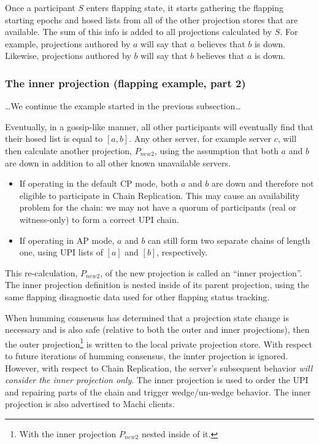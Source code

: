 \documentclass[preprint,10pt]{sigplanconf}
\begin{document}
Once a participant $S$ enters flapping state, it starts gathering the
flapping starting epochs and hosed lists from all of the other
projection stores that are available.  The sum of this info is added
to all projections calculated by $S$.
For example, projections authored by $a$ will say that $a$ believes
that $b$ is down. 
Likewise, projections authored by $b$ will say that $b$ believes
that $a$ is down. 

\subsubsection{The inner projection (flapping example, part 2)}
\label{ssec:inner-projection}

\ldots We continue the example started in the previous subsection\ldots

Eventually, in a gossip-like manner, all other participants will
eventually find that their hosed list is equal to $[a,b]$.  Any other
server, for example server $c$, will then calculate another
projection, $P_{new2}$, using the assumption that both $a$ and $b$
are down in addition to all other known unavailable servers.

\begin{itemize}
\item If operating in the default CP mode, both $a$ and $b$ are down
  and therefore not eligible to participate in Chain Replication.
  This may cause an availability problem for the chain: we may not
  have a quorum of participants (real or witness-only) to form a
  correct UPI chain.
\item If operating in AP mode, $a$ and $b$ can still form two separate
  chains of length one, using UPI lists of $[a]$ and $[b]$, respectively. 
\end{itemize}

This re-calculation, $P_{new2}$, of the new projection is called an
``inner projection''.  The inner projection definition is nested
inside of its parent projection, using the same flapping disagnostic
data used for other flapping status tracking.

When humming consensus has determined that a projection state change
is necessary and is also safe (relative to both the outer and inner
projections), then the outer projection\footnote{With the inner
  projection $P_{new2}$ nested inside of it.} is written to
the local private projection store.
With respect to future iterations of
humming consensus, the innter projection is ignored.
However, with respect to Chain Replication, the server's subsequent
behavior 
{\em will consider the inner projection only}.  The inner projection
is used to order the UPI and repairing parts of the chain and trigger
wedge/un-wedge behavior.  The inner projection is also
advertised to Machi clients.
\end{document}
